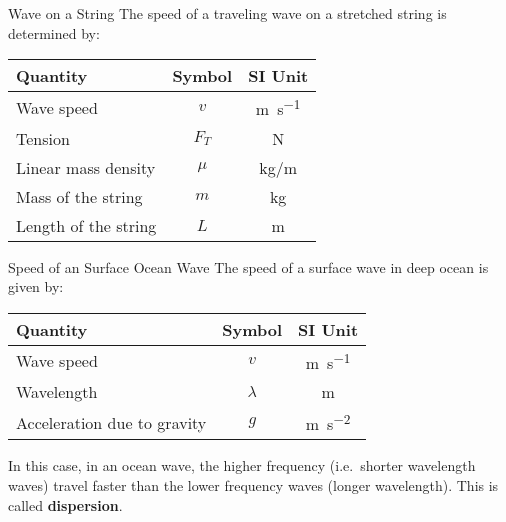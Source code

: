 \documentclass[12pt,aspectratio=169]{beamer}
\newcommand{\eq}[2]{\vspace{#1}{\Large\begin{displaymath}#2\end{displaymath}}}
\begin{document}
\begin{frame}{Wave on a String}
  The speed of a traveling wave on a stretched string is determined by:
  
  \eq{-.2in}{
    \boxed{v=\sqrt{\frac{F_T}{\mu}}}
    \quad\text{\normalsize where}\quad
    \boxed{\mu=\frac{m}{L}}
  }
  \begin{center}
    \begin{tabular}{l|c|c}
      \rowcolor{pink}
      \textbf{Quantity} & \textbf{Symbol} & \textbf{SI Unit} \\ \hline
      Wave speed           & $v$    & \si{\metre\per\second} \\
      Tension              & $F_T$  & \si{\newton} \\
      Linear mass density  & $\mu$  & \si{\kilo\gram/\metre} \\
      Mass of the string   & $m$    & \si{\kilo\gram} \\
      Length of the string & $L$    & \si{\metre}
    \end{tabular}
  \end{center}
\end{frame}



\begin{frame}{Speed of an Surface Ocean Wave}
  The speed of a surface wave in deep ocean is given by:
  
  \eq{-.2in}{
    \boxed{v=\sqrt{\frac{\lambda g}{2\pi}}}
  }
  \begin{center}
    \begin{tabular}{l|c|c}
      \rowcolor{pink}
      \textbf{Quantity} & \textbf{Symbol} & \textbf{SI Unit} \\ \hline
      Wave speed           & $v$       & \si{\metre\per\second} \\
      Wavelength           & $\lambda$ & \si{\metre} \\
      Acceleration due to gravity & $g$ & \si{\metre\per\second^2}
    \end{tabular}
  \end{center}
  In this case, in an ocean wave, the higher frequency (i.e.\ shorter wavelength
  waves) travel faster than the lower frequency waves (longer wavelength). This
  is called \textbf{dispersion}.
\end{frame}
\end{document}
